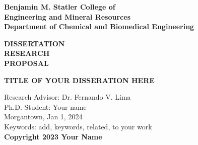 \begin{titlepage}
    \begin{center}
        

        \begin{figure}[H]
            \centering
        \end{figure}

        \normalsize	    
        \textbf{Benjamin M. Statler College of} \\
        \textbf{Engineering and Mineral Resources} \\
        \textbf{Department of Chemical and Biomedical Engineering} \\
        \vspace{1.0cm}

        \huge
        \textbf{DISSERTATION} \\
        \textbf{RESEARCH} \\
        \textbf{PROPOSAL} \\
        \vspace{1.0cm}

        \normalsize	
        \uppercase{\textbf{Title of your Disseration here}}
            
        \vspace{1.0cm}

        \normalsize
        Research Advisor: Dr. Fernando V. Lima\\
        Ph.D. Student: Your name\\
        \vspace{1.5cm}
        \vfill
        Morgantown, Jan 1, 2024\\
        
        \vfill
        Keywords: add, keywords, related, to your work \\
        \vspace{0.5cm}
        \textbf{Copyright 2023 Your Name}
    \end{center}
\end{titlepage}